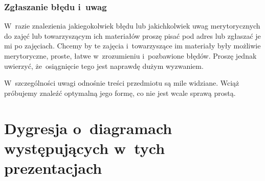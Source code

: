 \documentclass[10pt,t]{beamer}
\begin{document}
\begin{frame}
  \frametitle{Zgłaszanie błędu i~uwag}


  W~razie znalezienia jakiegokolwiek błędu lub jakichkolwiek uwag
  merytorycznych do zajęć lub towarzyszącym ich materiałów proszę pisać pod
  adres \email{ } lub zgłaszać je mi po zajęciach. Chcemy by te zajęcia
  i~towarzyszące im materiały były możliwie merytoryczne, proste, łatwe
  w~zrozumieniu i~pozbawione błędów. Proszę jednak uwierzyć, że~osiągnięcie
  tego jest naprawdę dużym wyzwaniem.

  W~szczególności uwagi odnośnie treści przedmiotu są mile widziane.
  Wciąż próbujemy znaleźć optymalną jego formę, co nie jest wcale sprawą
  prostą.

\end{frame}










\section{Dygresja o~diagramach występujących w~tych
  prezentacjach}
\end{document}
